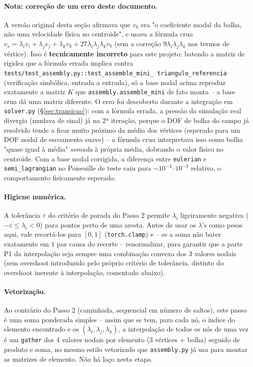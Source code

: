 \documentclass[11pt,a4paper]{article}
\begin{document}
\paragraph{Nota: correção de um erro deste documento.} A versão
original desta seção afirmava que $v_b$ era "o coeficiente modal da
bolha, não uma velocidade física no centroide", e usava a fórmula
crua $v_\star=\lambda_i v_i+\lambda_j v_j+\lambda_k v_k+27\lambda_i
\lambda_j\lambda_k v_b$ (sem a correção $9\lambda_i\lambda_j\lambda_k$
nos termos de vértice). Isso é \textbf{tecnicamente incorreto} para
este projeto: batendo a matriz de rigidez que a fórmula errada
implica contra \texttt{tests/test\_assembly.py::test\_assemble\_mini\_%
triangulo\_referencia} (verificação simbólica, entrada a entrada), só
a base nodal acima reproduz exatamente a matriz $K$ que
\texttt{assembly.assemble\_mini} de fato monta -- a base crua dá uma
matriz diferente. O erro foi descoberto durante a integração em
\texttt{solver.py} (\S\ref{sec:transicao}): com a fórmula errada, a
pressão da simulação real divergia (mudava de sinal) já na 2ª
iteração, porque o DOF de bolha do campo já resolvido tende a ficar
muito próximo da média dos vértices (esperado para um DOF nodal de
escoamento suave) -- a fórmula crua interpretava isso como bolha
"quase igual à média" \emph{somada} à própria média, dobrando o valor
físico no centroide. Com a base nodal corrigida, a diferença entre
\texttt{eulerian} e \texttt{semi\_lagrangian} no Poiseuille de teste
caiu para ${\sim}10^{-4}$--$10^{-3}$ relativo, o comportamento
fisicamente esperado.

\paragraph{Higiene numérica.} A tolerância $\varepsilon$ do critério
de parada do Passo 2 permite $\lambda_i$ ligeiramente negativa
($-\varepsilon \le \lambda_i < 0$) para pontos perto de uma aresta.
Antes de usar os $\lambda$'s como pesos aqui, vale recortá-los para
$[0,1]$ (\texttt{torch.clamp}) e -- se a soma não bater exatamente em
$1$ por causa do recorte -- renormalizar, para garantir que a parte
P1 da interpolação seja sempre uma combinação convexa dos 3 valores
nodais (sem overshoot introduzido pelo próprio critério de tolerância,
distinto do overshoot inerente à interpolação, comentado abaixo).

\paragraph{Vetorização.} Ao contrário do Passo 2 (caminhada,
sequencial em número de saltos), este passo é uma soma ponderada
simples -- assim que se tem, para cada nó, o índice do elemento
encontrado e os $(\lambda_i,\lambda_j,\lambda_k)$, a interpolação de
todos os nós de uma vez é um \texttt{gather} dos 4 valores nodais por
elemento (3 vértices + bolha) seguido de produto e soma, no mesmo
estilo vetorizado que \texttt{assembly.py} já usa para montar as
matrizes de elemento. Não há laço nesta etapa.
\end{document}
